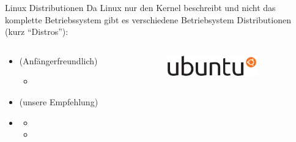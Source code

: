 \documentclass{setbeamer}
\begin{document}
\begin{frame}{Linux Distributionen}
    Da Linux nur den Kernel beschreibt und nicht das komplette Betriebssystem gibt es verschiedene Betriebsystem Distributionen (kurz ``Distros''):

    \begin{columns}
        \begin{column}{0.5\textwidth}
            \begin{itemize}
                \item {} (Anfängerfreundlich)
                \begin{itemize}
                    \item {}
                \end{itemize}
            
                \item {} (unsere Empfehlung)
            
                \item {}
                \begin{itemize}
                    \item {}
                    \item {}
                \end{itemize}
            \end{itemize}
        \end{column}

        \begin{column}{0.5\textwidth}
            \begin{figure}[h]
                \includegraphics[width=4cm, keepaspectratio]{./resources/ubuntu.png}
            \end{figure}


\end{column}
\end{columns}
\end{frame}
\end{document}
